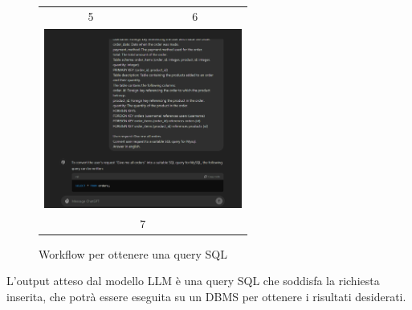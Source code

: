 \begin{figure}[H]
{\begin{tabular}{cc}
    5 & 6 \\[6pt]
    \multicolumn{2}{c}{\includegraphics[width=65mm]{assets/workflow_7.png}}\\
    \multicolumn{2}{c}{7}
  \end{tabular}}
  \caption{Workflow per ottenere una query SQL}
\end{figure}
\par L'output atteso dal modello LLM è una query SQL che soddisfa la richiesta inserita, che potrà essere eseguita su un DBMS per ottenere i risultati desiderati.